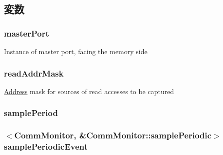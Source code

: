 \subsection{変数}
\hypertarget{classCommMonitor_a2eb439e94fc831a4b07a2e5d4268a365}{
\subsubsection[{masterPort}]{ {\bf masterPort}}}
\label{classCommMonitor_a2eb439e94fc831a4b07a2e5d4268a365}
Instance of master port, facing the memory side \hypertarget{classCommMonitor_abf0db97222382e11cb1264c6709629b3}{
\subsubsection[{readAddrMask}]{ {\bf readAddrMask}}}
\label{classCommMonitor_abf0db97222382e11cb1264c6709629b3}
\hyperlink{classAddress}{Address} mask for sources of read accesses to be captured \hypertarget{classCommMonitor_a2b79d72692e74b1c084ea31e63c5cf55}{
\subsubsection[{samplePeriod}]{ {\bf samplePeriod}}}
\label{classCommMonitor_a2b79d72692e74b1c084ea31e63c5cf55}
\hypertarget{classCommMonitor_a59f6dafc1b1b5cf7eda2e4a47a47c515}{
\subsubsection[{samplePeriodicEvent}]{$<${\bf CommMonitor}, \&CommMonitor::samplePeriodic$>$ {\bf samplePeriodicEvent}}}
